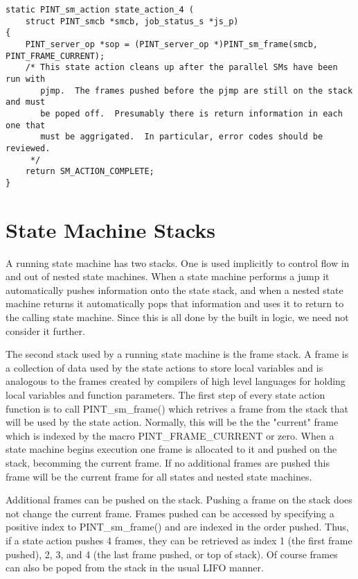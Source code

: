 \begin{verbatim}
static PINT_sm_action state_action_4 (
    struct PINT_smcb *smcb, job_status_s *js_p)
{
    PINT_server_op *sop = (PINT_server_op *)PINT_sm_frame(smcb, PINT_FRAME_CURRENT);
    /* This state action cleans up after the parallel SMs have been run with
       pjmp.  The frames pushed before the pjmp are still on the stack and must
       be poped off.  Presumably there is return information in each one that
       must be aggrigated.  In particular, error codes should be reviewed.
     */
    return SM_ACTION_COMPLETE;
}

\end{verbatim}

\section{State Machine Stacks}

A running state machine has two stacks.  One is used implicitly to control flow 
in and out of nested state machines.  When a state machine performs a jump it
automatically pushes information onto the state stack, and when a nested
state machine returns it automatically pops that information and uses it to
return to the calling state machine.  Since this is all done by the built in
logic, we need not consider it further.

The second stack used by a running state machine is the frame stack.  A frame
is a collection of data used by the state actions to store local variables and
is analogous to the frames created by compilers of high level languages for
holding local variables and function parameters.  The first step of every
state action function is to call PINT_sm_frame() which retrives a frame from the
stack that will be used by the state action. Normally, this will be the 
the "current" frame which is indexed by the macro PINT_FRAME_CURRENT or zero.
When a state machine begins execution one frame is allocated to it and pushed
on the stack, becomming the current frame.  If no additional frames are pushed
this frame will be the current frame for all states and nested state machines.

Additional frames can be pushed on the stack.  Pushing a frame on the stack
does not change the current frame.  Frames pushed can be accessed by specifying
a positive index to PINT_sm_frame() and are indexed in the order pushed.  Thus,
if a state action pushes 4 frames, they can be retrieved  as index 1 (the first
frame pushed), 2, 3, and 4 (the last frame pushed, or top of stack).  Of course
frames can also be poped from the stack in the usual LIFO manner.


